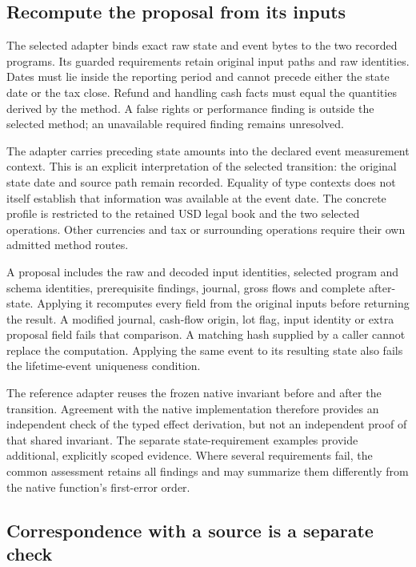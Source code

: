 \subsection{Recompute the proposal from its inputs}

The selected  adapter binds exact raw state and
event bytes to the two recorded programs. Its guarded requirements retain
original input paths and raw identities. Dates must lie inside the reporting
period and cannot precede either the state date or the tax close. Refund and
handling cash facts must equal the quantities derived by the method. A false
rights or performance finding is outside the selected method; an unavailable
required finding remains unresolved.

The adapter carries preceding state amounts into the declared event measurement
context. This is an explicit interpretation of the selected transition: the
original state date and source path remain recorded. Equality of type contexts
does not itself establish that information was available at the event date.
The concrete profile is restricted to the retained USD legal book and the two
selected operations. Other currencies and tax or surrounding operations require
their own admitted method routes.

A proposal includes the raw and decoded input identities, selected program and
schema identities, prerequisite findings, journal, gross flows and complete
after-state. Applying it recomputes every field from the original inputs before
returning the result. A modified journal, cash-flow origin, lot flag, input
identity or extra proposal field fails that comparison. A matching hash supplied
by a caller cannot replace the computation. Applying the same event to its
resulting state also fails the lifetime-event uniqueness condition.

The reference adapter reuses the frozen native invariant before and after the
transition. Agreement with the native implementation therefore provides an
independent check of the typed effect derivation, but not an independent proof
of that shared invariant. The separate state-requirement examples provide
additional, explicitly scoped evidence. Where several requirements fail,
the common assessment retains all findings and may summarize them differently
from the native function's first-error order.

\subsection{Correspondence with a source is a separate check}

